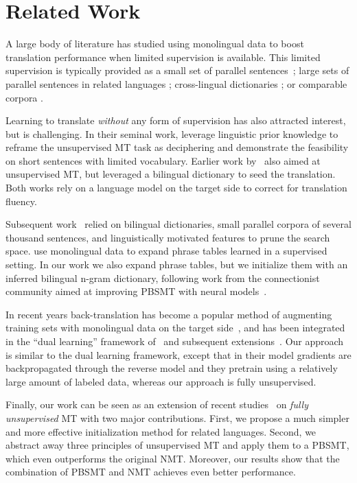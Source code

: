 \documentclass[11pt,a4paper]{article}
\begin{document}
\section{Related Work} \label{sec:related}
A large body of literature has studied using monolingual data to boost translation performance when limited supervision is available. This limited supervision is typically provided as a small set of parallel sentences~\cite{sennrich2015improving, gulcehre2015using, he2016dual, gu18, wang18}; large sets of parallel sentences in related languages \cite{firat16, gmt17, chen17acl, zheng17}; cross-lingual dictionaries \cite{klementiev12EACL, irvine14, irvine15}; or comparable corpora \cite{marcu04, irvine13}.

Learning to translate \textit{without} any form of supervision has also attracted interest, but is challenging. In their seminal work, \citet{knight_acl11} leverage linguistic prior knowledge to reframe the unsupervised MT task as deciphering and demonstrate the feasibility on short sentences with limited vocabulary. Earlier work by~\citet{carbonell06} also aimed at unsupervised MT, but leveraged a bilingual dictionary to seed the translation. Both works rely on a language model on the target side to correct for translation fluency.

Subsequent work~\cite{klementiev12EACL, irvine14, irvine15} relied on bilingual dictionaries, small parallel corpora of several thousand sentences, and linguistically motivated features to prune the search space.
\citet{irvine14} use monolingual data to expand phrase tables learned in a supervised setting. In our work we also expand phrase tables, but we initialize them with an inferred bilingual n-gram dictionary, following work from the connectionist community aimed at improving PBSMT with neural models~\cite{schwenk12, Kalchbrenner13, cho-al-emnlp14}.

In recent years back-translation has become a popular method of augmenting training sets with monolingual data on the target side~\cite{sennrich2015improving},
and has been integrated in the ``dual learning'' framework of~\citet{he2016dual} and subsequent extensions~\cite{wang18}.
Our approach is similar to the dual learning framework, except that in their model gradients are backpropagated through the reverse model and they pretrain using a relatively large amount of labeled data, whereas our approach is fully unsupervised.

Finally, our work can be seen as an extension of recent studies~\cite{unsupNMTlample,unsupNMTartetxe,unsupNMTyang} on {\it fully unsupervised} MT with two major contributions. First, we propose a much simpler and more effective initialization method for related languages. Second, we abstract away three principles of unsupervised MT and apply them to a PBSMT, which even outperforms the original NMT. Moreover, our results show that the combination of PBSMT and NMT achieves even better performance.
\end{document}
